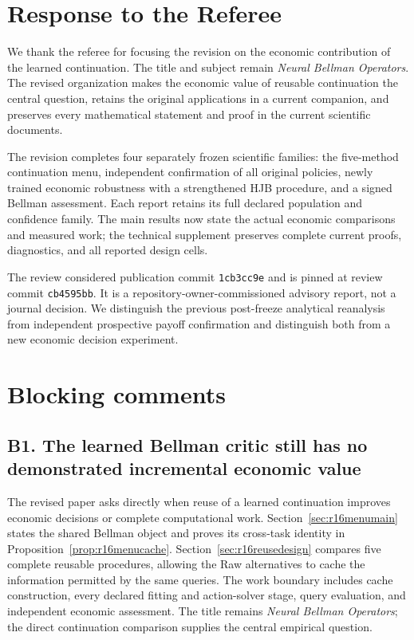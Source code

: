 \section*{Response to the Referee}
We thank the referee for focusing the revision on the economic contribution of the learned continuation. The title and subject remain \emph{Neural Bellman Operators}. The revised organization makes the economic value of reusable continuation the central question, retains the original applications in a current companion, and preserves every mathematical statement and proof in the current scientific documents.

The revision completes four separately frozen scientific families: the five-method continuation menu, independent confirmation of all original policies, newly trained economic robustness with a strengthened HJB procedure, and a signed Bellman assessment. Each report retains its full declared population and confidence family. The main results now state the actual economic comparisons and measured work; the technical supplement preserves complete current proofs, diagnostics, and all reported design cells.

The review considered publication commit \texttt{1cb3cc9e} and is pinned at review commit \texttt{cb4595bb}. It is a repository-owner-commissioned advisory report, not a journal decision. We distinguish the previous post-freeze analytical reanalysis from independent prospective payoff confirmation and distinguish both from a new economic decision experiment.

\section{Blocking comments}
\subsection*{B1. The learned Bellman critic still has no demonstrated incremental economic value}\label{resp:B1}
The revised paper asks directly when reuse of a learned continuation improves economic decisions or complete computational work. Section~\ref{sec:r16menumain} states the shared Bellman object and proves its cross-task identity in Proposition~\ref{prop:r16menucache}. Section~\ref{sec:r16reusedesign} compares five complete reusable procedures, allowing the Raw alternatives to cache the information permitted by the same queries. The work boundary includes cache construction, every declared fitting and action-solver stage, query evaluation, and independent economic assessment. The title remains \emph{Neural Bellman Operators}; the direct continuation comparison supplies the central empirical question.


